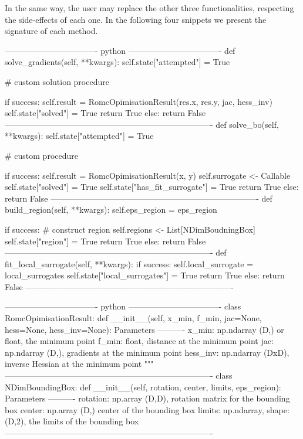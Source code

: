 In the same way, the user may replace the other three functionalities,
respecting the side-effects of each one. In the following four
snippets we present the signature of each method. 


\begin{Code}
---------------------------------- python ----------------------------------
def solve_gradients(self, **kwargs):
  self.state["attempted"] = True

  # custom solution procedure
  
  if success:
    self.result = RomcOpimisationResult(res.x, res.y, jac, hess_inv)
    self.state["solved"] = True
    return True
  else:
    return False
----------------------------------------------------------------------------    
def solve_bo(self, **kwargs):
  self.state["attempted"] = True

  # custom procedure

  if success:
    self.result = RomcOpimisationResult(x, y)
    self.surrogate <- Callable
    self.state["solved"] = True
    self.state["has_fit_surrogate"] = True
    return True
  else:
    return False
----------------------------------------------------------------------------    
def build_region(self, **kwargs):
    self.eps_region = eps_region

    if success:
        # construct region
        self.regions <- List[NDimBoudningBox]
        self.state["region"] = True
        return True
    else:
        return False
----------------------------------------------------------------------------    
def fit_local_surrogate(self, **kwargs):
  if success:
    self.local_surrogate = local_surrogates
    self.state["local_surrogates"] = True
    return True
  else:
    return False
----------------------------------------------------------------------------    
\end{Code}


\begin{Code}
---------------------------------- python ----------------------------------
class RomcOpimisationResult:
    def __init__(self, x_min, f_min, jac=None, hess=None, hess_inv=None):
        Parameters
        ----------
        x_min: np.ndarray (D,) or float, the minimum point
        f_min: float, distance at the minimum point
        jac: np.ndarray (D,), gradients at the minimum point
        hess_inv: np.ndarray (DxD), inverse Hessian at the minimum point
        """
----------------------------------------------------------------------------    
class NDimBoundingBox:
    def __init__(self, rotation, center, limits, eps_region):
        Parameters
        ----------
        rotation: np.array (D,D),  rotation matrix for the bounding box
        center: np.array (D,) center of the bounding box
        limits: np.ndarray, shape: (D,2), the limits of the bounding box
----------------------------------------------------------------------------    
\end{Code}

